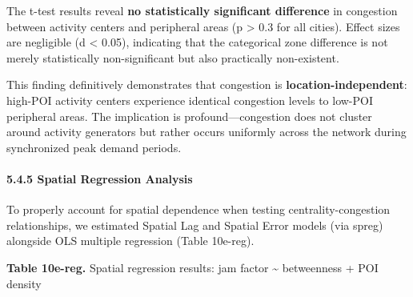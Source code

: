 \documentclass[
  12pt,
]{article}
\begin{document}
The t-test results reveal \textbf{no statistically significant difference} in congestion between activity centers and peripheral areas (p \textgreater{} 0.3 for all cities). Effect sizes are negligible (\textbar d\textbar{} \textless{} 0.05), indicating that the categorical zone difference is not merely statistically non-significant but also practically non-existent.

This finding definitively demonstrates that congestion is \textbf{location-independent}: high-POI activity centers experience identical congestion levels to low-POI peripheral areas. The implication is profound---congestion does not cluster around activity generators but rather occurs uniformly across the network during synchronized peak demand periods.

\paragraph{5.4.5 Spatial Regression Analysis}\label{spatial-regression-analysis}

To properly account for spatial dependence when testing centrality-congestion relationships, we estimated Spatial Lag and Spatial Error models (via spreg) alongside OLS multiple regression (Table 10e-reg).

\textbf{Table 10e-reg.} Spatial regression results: jam factor \textasciitilde{} betweenness + POI density
\end{document}
